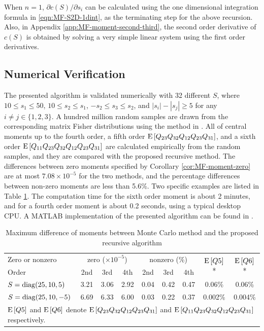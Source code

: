 When $n=1$, $\partial c(S)/\partial s_i$ can be calculated using the one dimensional integration formula in \eqref{eqn:MF-S2D-1dint}, as the terminating step for the above recursion.
Also, in Appendix \ref{app:MF-moment-second-third}, the second order derivative of $c(S)$ is obtained by solving a very simple linear system using the first order derivatives.

\subsection{Numerical Verification}

The presented algorithm is validated numerically with 32 different $S$, where $10 \leq s_1 \leq 50$, $10 \leq s_2 \leq s_1$, $-s_2 \leq s_3 \leq s_2$, and $|s_i|-|s_j| \geq 5$ for any $i\neq j\in\{1,2,3\}$.
A hundred million random samples are drawn from the corresponding matrix Fisher distributions using the method in \cite{kent2013new}.
All of central moments up to the fourth order, a fifth order $\mathrm{E}\left[ Q_{23}Q_{32}Q_{12}Q_{23}Q_{31} \right]$, and a sixth order $\mathrm{E}\left[ Q_{11}Q_{23}Q_{32}Q_{12}Q_{23}Q_{31} \right]$ are calculated empirically from the random samples, and they are compared with the proposed recursive method.
The differences between zero moments specified by Corollary \ref{cor:MF-moment-zero} are at most $7.08\times 10^{-5}$ for the two methods, and the percentage differences between non-zero moments are less than 5.6\%.
Two specific examples are listed in Table \ref{tab:MF-moment-result}.
The computation time for the sixth order moment is about 2 minutes, and for a fourth order moment is about 0.2 seconds, using a typical desktop CPU.
A MATLAB implementation of the presented algorithm can be found in \cite{MFMomentCode}.

\begin{table}
	\centering
	\caption{Maximum difference of moments between Monte Carlo method and the proposed recursive algorithm \label{tab:MF-moment-result}}
	\begin{tabular}{l|ccc|ccc|c|c}
		\hline
		Zero or nonzero & \multicolumn{3}{c|}{zero ($\times 10^{-5}$)} & \multicolumn{3}{c|}{nonzero (\%)} & \multirow{2}{*}{$\mathrm{E}\left[ Q5 \right]$*} & \multirow{2}{*}{$\mathrm{E}\left[ Q6 \right]$*} \\ 
		Order & 2nd & 3rd & 4th & 2nd & 3rd & 4th & \\ \hline
		$S = \mathrm{diag}(25,10,5)$ & 3.21 & 3.06 & 2.92 & 0.04 & 0.42 & 0.47 & 0.06\% & 0.06\% \\
		$S = \mathrm{diag}(25,10,-5)$ & 6.69 & 6.33 & 6.00 & 0.03 & 0.22 & 0.37 & 0.002\% & 0.004\% \\ \hline
		\multicolumn{9}{l}{\footnotesize * $\mathrm{E}\left[ Q5 \right]$ and $\mathrm{E}\left[ Q6 \right]$ denote $\mathrm{E}\left[ Q_{23}Q_{32}Q_{12}Q_{23}Q_{31} \right]$ and $\mathrm{E}\left[ Q_{11}Q_{23}Q_{32}Q_{12}Q_{23}Q_{31} \right]$ respectively.}
	\end{tabular}
\end{table}

